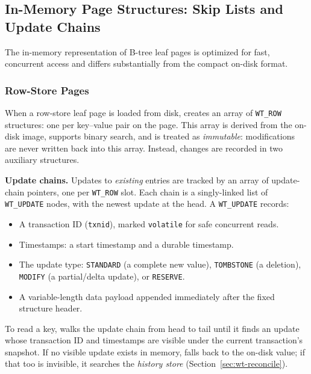 \subsection{In-Memory Page Structures: Skip Lists and Update Chains}
\label{sec:wt-skiplist}

The in-memory representation of B-tree leaf pages is optimized for fast, concurrent access and differs substantially from the compact on-disk format.

\subsubsection{Row-Store Pages}

When a row-store leaf page is loaded from disk, \wt{} creates an array of \texttt{WT\_ROW} structures: one per key--value pair on the page.
This array is derived from the on-disk image, supports binary search, and is treated as \emph{immutable}: modifications are never written back into this array.
Instead, changes are recorded in two auxiliary structures.

\textbf{Update chains.}  Updates to \emph{existing} entries are tracked by an
array of update-chain pointers, one per \texttt{WT\_ROW} slot.
Each chain is a singly-linked list of \texttt{WT\_UPDATE} nodes, with the newest update at the head.
A \texttt{WT\_UPDATE} records:

\begin{itemize}
  \item A transaction ID (\texttt{txnid}), marked \texttt{volatile} for safe
    concurrent reads.
  \item Timestamps: a start timestamp and a durable timestamp.
  \item The update type: \texttt{STANDARD} (a complete new value),
    \texttt{TOMBSTONE} (a deletion), \texttt{MODIFY} (a partial/delta update),
    or \texttt{RESERVE}.
  \item A variable-length data payload appended immediately after the fixed structure header.
\end{itemize}

To read a key, \wt{} walks the update chain from head to tail until it finds an update whose transaction ID and timestamps are visible under the current transaction's snapshot.
If no visible update exists in memory, \wt{} falls back to the on-disk value; if that too is invisible, it searches the \emph{history store} (Section~\ref{sec:wt-reconcile}).

